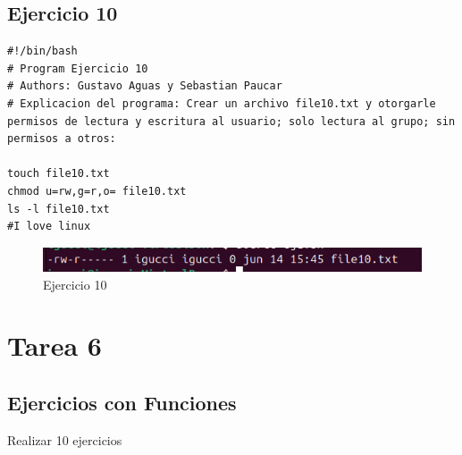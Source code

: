 \documentclass[11pt,twoside]{book}
\begin{document}
\subsection{Ejercicio 10}

\begin{lstlisting}
#!/bin/bash
# Program Ejercicio 10
# Authors: Gustavo Aguas y Sebastian Paucar
# Explicacion del programa: Crear un archivo file10.txt y otorgarle permisos de lectura y escritura al usuario; solo lectura al grupo; sin permisos a otros:

touch file10.txt
chmod u=rw,g=r,o= file10.txt
ls -l file10.txt
#I love linux
\end{lstlisting}
\begin{figure}
    \centering
    \includegraphics[width=1\linewidth]{psimb/ej10.png}
    \caption{Ejercicio 10}
\end{figure}

\newpage
\section{Tarea 6}
\subsection{Ejercicios con Funciones}
Realizar 10 ejercicios
\end{document}
